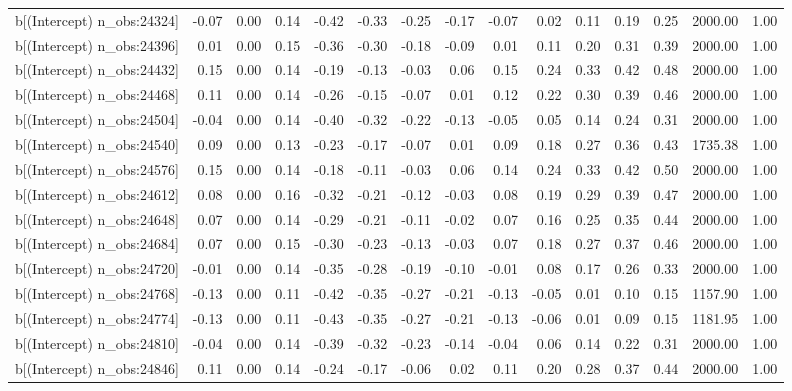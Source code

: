 \begin{table}[ht]
\begin{tabular}{rrrrrrrrrrrrrrr}
  b[(Intercept) n\_obs:24324] & -0.07 & 0.00 & 0.14 & -0.42 & -0.33 & -0.25 & -0.17 & -0.07 & 0.02 & 0.11 & 0.19 & 0.25 & 2000.00 & 1.00 \\ 
  b[(Intercept) n\_obs:24396] & 0.01 & 0.00 & 0.15 & -0.36 & -0.30 & -0.18 & -0.09 & 0.01 & 0.11 & 0.20 & 0.31 & 0.39 & 2000.00 & 1.00 \\ 
  b[(Intercept) n\_obs:24432] & 0.15 & 0.00 & 0.14 & -0.19 & -0.13 & -0.03 & 0.06 & 0.15 & 0.24 & 0.33 & 0.42 & 0.48 & 2000.00 & 1.00 \\ 
  b[(Intercept) n\_obs:24468] & 0.11 & 0.00 & 0.14 & -0.26 & -0.15 & -0.07 & 0.01 & 0.12 & 0.22 & 0.30 & 0.39 & 0.46 & 2000.00 & 1.00 \\ 
  b[(Intercept) n\_obs:24504] & -0.04 & 0.00 & 0.14 & -0.40 & -0.32 & -0.22 & -0.13 & -0.05 & 0.05 & 0.14 & 0.24 & 0.31 & 2000.00 & 1.00 \\ 
  b[(Intercept) n\_obs:24540] & 0.09 & 0.00 & 0.13 & -0.23 & -0.17 & -0.07 & 0.01 & 0.09 & 0.18 & 0.27 & 0.36 & 0.43 & 1735.38 & 1.00 \\ 
  b[(Intercept) n\_obs:24576] & 0.15 & 0.00 & 0.14 & -0.18 & -0.11 & -0.03 & 0.06 & 0.14 & 0.24 & 0.33 & 0.42 & 0.50 & 2000.00 & 1.00 \\ 
  b[(Intercept) n\_obs:24612] & 0.08 & 0.00 & 0.16 & -0.32 & -0.21 & -0.12 & -0.03 & 0.08 & 0.19 & 0.29 & 0.39 & 0.47 & 2000.00 & 1.00 \\ 
  b[(Intercept) n\_obs:24648] & 0.07 & 0.00 & 0.14 & -0.29 & -0.21 & -0.11 & -0.02 & 0.07 & 0.16 & 0.25 & 0.35 & 0.44 & 2000.00 & 1.00 \\ 
  b[(Intercept) n\_obs:24684] & 0.07 & 0.00 & 0.15 & -0.30 & -0.23 & -0.13 & -0.03 & 0.07 & 0.18 & 0.27 & 0.37 & 0.46 & 2000.00 & 1.00 \\ 
  b[(Intercept) n\_obs:24720] & -0.01 & 0.00 & 0.14 & -0.35 & -0.28 & -0.19 & -0.10 & -0.01 & 0.08 & 0.17 & 0.26 & 0.33 & 2000.00 & 1.00 \\ 
  b[(Intercept) n\_obs:24768] & -0.13 & 0.00 & 0.11 & -0.42 & -0.35 & -0.27 & -0.21 & -0.13 & -0.05 & 0.01 & 0.10 & 0.15 & 1157.90 & 1.00 \\ 
  b[(Intercept) n\_obs:24774] & -0.13 & 0.00 & 0.11 & -0.43 & -0.35 & -0.27 & -0.21 & -0.13 & -0.06 & 0.01 & 0.09 & 0.15 & 1181.95 & 1.00 \\ 
  b[(Intercept) n\_obs:24810] & -0.04 & 0.00 & 0.14 & -0.39 & -0.32 & -0.23 & -0.14 & -0.04 & 0.06 & 0.14 & 0.22 & 0.31 & 2000.00 & 1.00 \\ 
  b[(Intercept) n\_obs:24846] & 0.11 & 0.00 & 0.14 & -0.24 & -0.17 & -0.06 & 0.02 & 0.11 & 0.20 & 0.28 & 0.37 & 0.44 & 2000.00 & 1.00 \\ 

\end{tabular}
\end{table}
